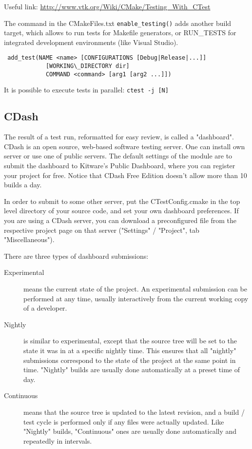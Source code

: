 \documentclass[a4paper,10pt]{article}
\begin{document}
Useful link: \url{http://www.vtk.org/Wiki/CMake/Testing_With_CTest}

The command in the CMakeFiles.txt \texttt{enable\_testing()} adds another build target, which allows to run tests for Makefile generators, or RUN\_TESTS for integrated development environments (like Visual Studio).



\begin{verbatim}
 add_test(NAME <name> [CONFIGURATIONS [Debug|Release|...]]
            [WORKING\_DIRECTORY dir]
            COMMAND <command> [arg1 [arg2 ...]])
\end{verbatim}

It is possible to execute tests in parallel:
\texttt{ctest -j [N]}

\subsection{CDash}

The result of a test run, reformatted for easy review, is called a "dashboard". CDash is an open source, web-based software testing server. One can install own server or use one of public servers.           
The default settings of the module are to submit the dashboard to Kitware's Public Dashboard, where you can register your project for free. Notice that CDash Free Edition doesn't allow more than 10 builds a day.

In order to submit to some other server, put the CTestConfig.cmake in the top level directory of your source code, and set your own dashboard preferences. If you are using a CDash server, you can download a preconfigured file from the respective project page on that server ("Settings" / "Project", tab "Miscellaneous").

There are three types of dashboard submissions:
\begin{description}
 \item[Experimental] means the current state of the project. An experimental submission can be performed at any time, usually interactively from the current working copy of a developer.
  \item[Nightly] is similar to experimental, except that the source tree will be set to the state it was in at a specific nightly time. This ensures that all "nightly" submissions correspond to the state of the project at the same point in time. "Nightly" builds are usually done automatically at a preset time of day.
 \item[Continuous] means that the source tree is updated to the latest revision, and a build / test cycle is performed only if any files were actually updated. Like "Nightly" builds, "Continuous" ones are usually done automatically and repeatedly in intervals.
\end{description}
\end{document}
